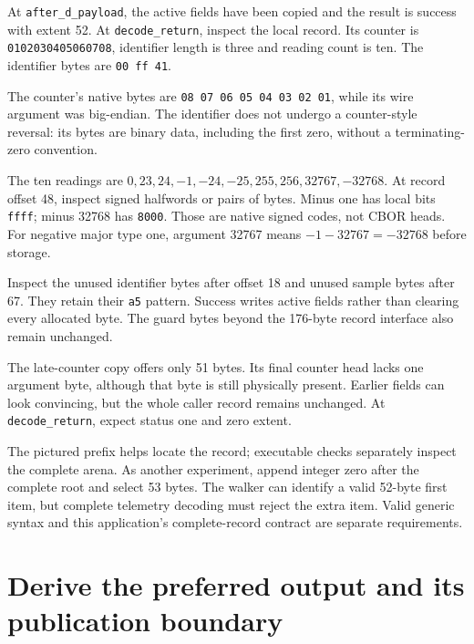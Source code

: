 At \texttt{after\_d\_payload}, the active fields have been copied and the
result is success with extent 52. At \texttt{decode\_return}, inspect the
local record. Its counter is \texttt{0102030405060708}, identifier length is
three and reading count is ten. The identifier bytes are \texttt{00 ff 41}.



The counter's native bytes are \texttt{08 07 06 05 04 03 02 01}, while its
wire argument was big-endian. The identifier does not undergo a counter-style
reversal: its bytes are binary data, including the first zero, without a
terminating-zero convention.

The ten readings are \(0,23,24,-1,-24,-25,255,256,32767,-32768\).
At record offset 48, inspect signed halfwords or pairs of bytes. Minus one has
local bits \texttt{ffff}; minus 32768 has \texttt{8000}. Those are native
signed codes, not CBOR heads. For negative major type one, argument 32767 means
$-1-32767=-32768$ before storage.



Inspect the unused identifier bytes after offset 18 and unused sample bytes after
67. They retain their \texttt{a5} pattern. Success writes active fields rather
than clearing every allocated byte. The guard bytes beyond the 176-byte record
interface also remain unchanged.

The late-counter copy offers only 51 bytes. Its final counter head lacks one
argument byte, although that byte is still physically present. Earlier fields
can look convincing, but the whole caller record remains unchanged. At
\texttt{decode\_return}, expect status one and zero extent.



The pictured prefix helps locate the record; executable checks separately inspect
the complete arena. As another experiment, append integer zero after the complete
root and select 53 bytes. The walker can identify a valid 52-byte first item,
but complete telemetry decoding must reject the extra item. Valid generic syntax
and this application's complete-record contract are separate requirements.

\section{Derive the preferred output and its publication boundary}

